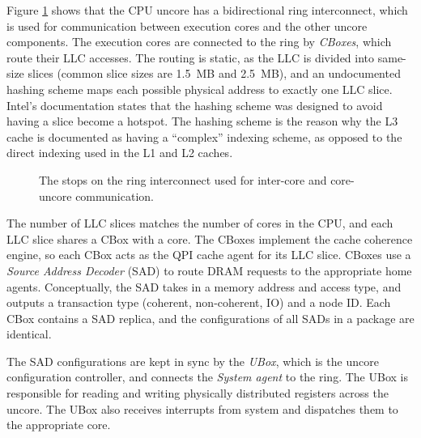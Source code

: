 
Figure \ref{fig:cpu_uncore} shows that the CPU uncore has a bidirectional ring
interconnect, which is used for communication between execution cores and the
other uncore components. The execution cores are connected to the ring by
\textit{CBoxes}, which route their LLC accesses. The routing is static, as the
LLC is divided into same-size slices (common slice sizes are 1.5~MB and
2.5~MB), and an undocumented hashing scheme maps each possible physical address
to exactly one LLC slice. Intel's documentation states that the hashing scheme
was designed to avoid having a slice become a hotspot. The hashing scheme is
the reason why the L3 cache is documented as having a ``complex'' indexing
scheme, as opposed to the direct indexing used in the L1 and L2 caches.

\begin{figure}[hbt]
  \caption{
    The stops on the ring interconnect used for inter-core and core-uncore
    communication.
  }
  \label{fig:cpu_uncore}
\end{figure}

The number of LLC slices matches the number of cores in the CPU, and each LLC
slice shares a CBox with a core. The CBoxes implement the cache coherence
engine, so each CBox acts as the QPI cache agent for its LLC slice. CBoxes
use a \textit{Source Address Decoder} (SAD) to route DRAM requests to the
appropriate home agents. Conceptually, the SAD takes in a memory address and
access type, and outputs a transaction type (coherent, non-coherent, IO) and a
node ID. Each CBox contains a SAD replica, and the configurations of all SADs
in a package are identical.

The SAD configurations are kept in sync by the \textit{UBox}, which is the
uncore configuration controller, and connects the \textit{System agent} to the
ring. The UBox is responsible for reading and writing physically distributed
registers across the uncore. The UBox also receives interrupts from system and
dispatches them to the appropriate core.

